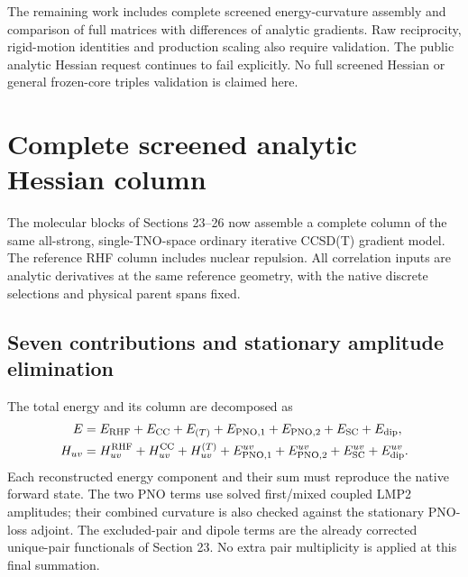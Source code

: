 \documentclass[11pt]{article}
\begin{document}
The remaining work includes complete screened energy-curvature assembly
and comparison of full matrices with differences of analytic gradients.
Raw reciprocity, rigid-motion identities and production scaling also
require validation. The public
analytic Hessian request continues to fail explicitly. No full screened
Hessian or general frozen-core triples validation is claimed here.

\section{Complete screened analytic Hessian column}
The molecular blocks of Sections 23--26 now assemble a complete column of
the same all-strong, single-TNO-space ordinary iterative CCSD(T) gradient
model. The reference RHF column includes nuclear repulsion. All correlation
inputs are analytic derivatives at the same reference geometry, with the
native discrete selections and physical parent spans fixed.

\subsection{Seven contributions and stationary amplitude elimination}
The total energy and its column are decomposed as
\begin{align}
 E&=E_{\rm RHF}+E_{\rm CC}+E_{(T)}+E_{\rm PNO,1}+E_{\rm PNO,2}
                  +E_{\rm SC}+E_{\rm dip},\\
 H_{uv}&=H^{\rm RHF}_{uv}+H^{\rm CC}_{uv}+H^{(T)}_{uv}
        +E_{\rm PNO,1}^{uv}+E_{\rm PNO,2}^{uv}
        +E_{\rm SC}^{uv}+E_{\rm dip}^{uv}.
 \label{eq:screened-complete-column}
\end{align}
Each reconstructed energy component and their sum must reproduce the
native forward state. The two PNO terms use solved first/mixed coupled
LMP2 amplitudes; their combined curvature is also checked against the
stationary PNO-loss adjoint. The excluded-pair and dipole terms are the
already corrected unique-pair functionals of Section 23. No extra pair
multiplicity is applied at this final summation.
\end{document}
